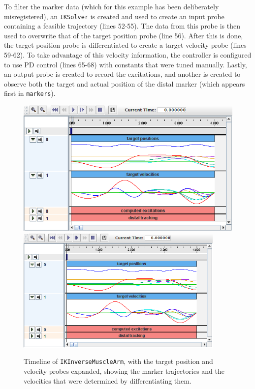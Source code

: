 To filter the marker data (which for this example has been deliberately
misregistered), an {\tt IKSolver} is created and used to create an input probe
containing a feasible trajectory (lines 52-55). The data from this probe is
then used to overwrite that of the target position probe (line 56). After this
is done, the target position probe is differentiated to create a target
velocity probe (lines 59-62). To take advantage of this velocity information,
the controller is configured to use PD control (lines 65-68) with constants
that were tuned manually. Lastly, an output probe is created to record the
excitations, and another is created to observe both the target and actual
position of the distal marker (which appears first in {\tt markers}).

\begin{figure}[ht]
\begin{center}
\iflatexml
 \includegraphics[]{images/IKInverseMuscleArmTimeline}
\else
 \includegraphics[width=4in]{images/IKInverseMuscleArmTimeline}
\fi
\end{center}
\caption{Timeline of {\tt IKInverseMuscleArm}, with the target position and
velocity probes expanded, showing the marker trajectories and the velocities
that were determined by differentiating them.}
\label{IKInverseMuscleArmTimeline:fig}
\end{figure}

